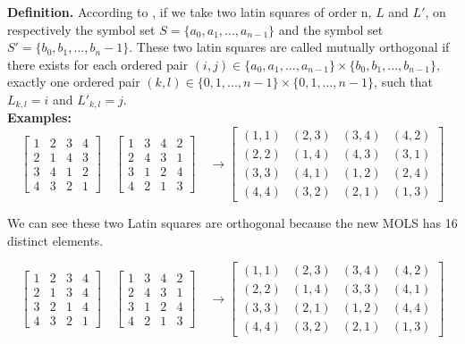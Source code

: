 \documentclass[12pt]{article}
\begin{document}
\textbf{Definition.} According to \cite{ref11}, if we take two latin squares of order n, $L$ and $L'$, on respectively the symbol set $S = \{a_0, a_1, . . . , a_{n−1}\}$ and the symbol set $S' = \{b_0, b_1, . . . , b_n−1\}$. These two latin squares are called mutually orthogonal if there exists for each ordered pair $(i, j) \in \{a_0, a_1, . . . , a_{n−1}\} \times \{b_0, b_1, . . . , b_{n−1}\}$, exactly one ordered pair $(k, l) \in \{0, 1, . . . , n-1\} \times \{0, 1, . . . , n-1\}$, such that $L_{k,l} = i$ and $L'_{k,l} = j$.\\

\textbf{Examples:} 
\[ \begin{bmatrix} 1 & 2 & 3 & 4\\2 & 1 & 4 & 3\\3 & 4 & 1 & 2\\4 & 3 & 2 & 1 \end{bmatrix} \quad
   \begin{bmatrix} 1 & 3 & 4 & 2\\2 & 4 & 3 & 1\\3 & 1 & 2 & 4\\4 & 2 & 1 & 3 \end{bmatrix} \quad
\rightarrow
   \begin{bmatrix}(1,1) & (2,3) & (3,4) & (4,2)\\(2,2) & (1,4) & (4,3) & (3,1)\\
                  (3,3) & (4,1) & (1,2) & (2,4)\\(4,4) & (3,2) & (2,1) & (1,3) \end{bmatrix} \]

We can see these two Latin squares are orthogonal because the new MOLS has 16 distinct elements.

\[ \begin{bmatrix} 1 & 2 & 3 & 4\\2 & 1 & 3 & 4\\3 & 2 & 1 & 4\\4 & 3 & 2 & 1 \end{bmatrix} \quad
   \begin{bmatrix} 1 & 3 & 4 & 2\\2 & 4 & 3 & 1\\3 & 1 & 2 & 4\\4 & 2 & 1 & 3 \end{bmatrix} \quad
\rightarrow
   \begin{bmatrix}(1,1) & (2,3) & (3,4) & (4,2)\\(2,2) & (1,4) & (3,3) & (4,1)\\
                  (3,3) & (2,1) & (1,2) & (4,4)\\(4,4) & (3,2) & (2,1) & (1,3) \end{bmatrix} \]
\end{document}
